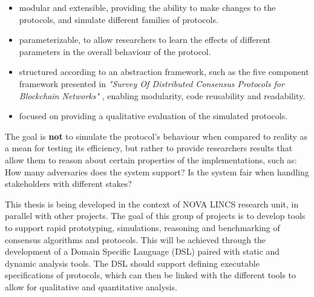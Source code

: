 \begin{itemize}
  \item modular and extensible, providing the ability to make changes to the protocols, and simulate different families of protocols.
  \item parameterizable, to allow researchers to learn the effects of different parameters in the overall behaviour of the protocol.
  \item structured according to an abstraction framework, such as the five component framework presented in \textit{"Survey Of Distributed Consensus Protocols for Blockchain Networks"} \cite{survey_bchain_networks}, enabling modularity, code reusability and readability.
  \item focused on providing a qualitative evaluation of the simulated protocols.
\end{itemize}

The goal is \textbf{not} to simulate the protocol's behaviour when compared to reality as a mean for testing its efficiency, but rather to provide researchers results that allow them to reason about certain properties of the implementations, such as: How many adversaries does the system support? Is the system fair when handling stakeholders with different stakes?

\vspace{0.5cm}

This thesis is being developed in the context of NOVA LINCS research unit, in parallel with other projects. The goal of this group of projects is to develop tools to support rapid prototyping, simulations, reasoning and benchmarking of consensus algorithms and protocols. This will be achieved through the development of a Domain Specific Language (DSL) paired with static and dynamic analysis tools. The DSL should support defining executable specifications of protocols, which can then be linked with the different tools to allow for qualitative and quantitative analysis.



